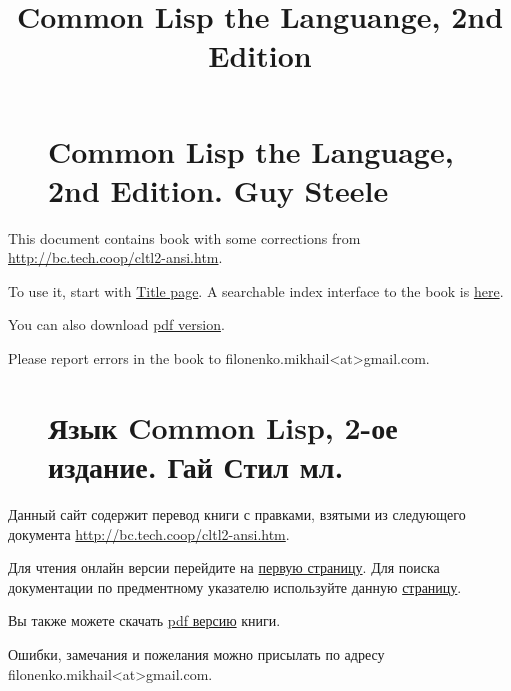 \documentclass{article}
\title{Common Lisp the Languange, 2nd Edition}
\begin{document}
\begin{figure}
\href{./en/clm.html}{} \section*{Common Lisp the Language, 2nd Edition. Guy Steele}
\end{figure}

This document contains book with some corrections from
\url{http://bc.tech.coop/cltl2-ansi.htm}.

To use it, start with \href{./en/clm.html}{Title page}. A searchable index
interface to the book is \href{./en/symbols.html}{here}.

You can also download \href{./enpdf/cltl2.pdf}{pdf version}.

Please report errors in the book to filonenko.mikhail<at>gmail.com.

\begin{figure}
\href{./ru/clm.html}{} \section*{Язык Common Lisp, 2-ое издание. Гай Стил мл.}
\end{figure}

Данный сайт содержит перевод книги с правками, взятыми из следующего документа
\url{http://bc.tech.coop/cltl2-ansi.htm}.

Для чтения онлайн версии перейдите на  \href{./ru/clm.html}{первую страницу}.
Для поиска документации по предментному указателю используйте данную \href{./en/symbols.html}{страницу}.

Вы также можете скачать \href{./rupdf/cltl2.pdf}{pdf версию} книги.

Ошибки, замечания и пожелания можно присылать по адресу filonenko.mikhail<at>gmail.com.
\end{document}
